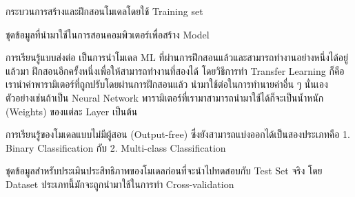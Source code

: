 \begin{description}[style=nextline]
    \item[Training] กระบวนการสร้างและฝึกสอนโมเดลโดยใช้ Training set 

    \item[Training Set] ชุดข้อมูลที่นำมาใช้ในการสอนคอมพิวเตอร์เพื่อสร้าง Model

    \item[Transfer Learning] การเรียนรู้แบบส่งต่อ เป็นการนำโมเดล ML ที่ผ่านการฝึกสอนแล้วและสามารถทำงานอย่างหนึ่งได้อยู่แล้วมา%
    ฝึกสอนอีกครั้งหนึ่งเพื่อให้สามารถทำงานที่สองได้ โดยวิธีการทำ Transfer Learning ก็คือเรานำค่าพารามิเตอร์ที่ถูกปรับโดยผ่านการฝึกสอนแล้ว
    นำมาใช้ต่อในการทำนายค่าอื่น ๆ นั่นเอง ตัวอย่างเช่นถ้าเป็น Neural Network พารามิเตอร์ที่เรามาสามารถนำมาใช้ได้ก็จะเป็นน้ำหนัก (Weights) 
    ของแต่ละ Layer เป็นต้น

    \item[Unsupervised Learning] การเรียนรู้ของโมเดลแบบไม่มีผู้สอน (Output-free)
    ซึ่งยังสามารถแบ่งออกได้เป็นสองประเภทคือ 1. Binary Classification กับ 2. Multi-class Classification

    \item[Validation Set] ชุดข้อมูลสำหรับประเมินประสิทธิภาพของโมเดลก่อนที่จะนำไปทดสอบกับ Test Set จริง 
    โดย Dataset ประเภทนี้มักจะถูกนำมาใช้ในการทำ Cross-validation
\end{description}
